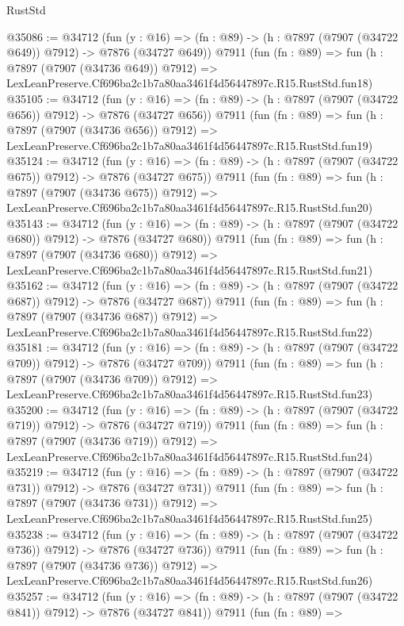 \begin{lexlean}{RustStd}
\begin{coremodule}
@35086 := @34712
    (fun (y : @16) => (fn : @89) -> (h : @7897 (@7907 (@34722 @649)) @7912) -> @7876 (@34727 @649))
    @7911
    (fun (fn : @89) =>
    fun (h : @7897 (@7907 (@34736 @649)) @7912) =>
    LexLeanPreserve.Cf696ba2c1b7a80aa3461f4d56447897c.R15.RustStd.fun18)
@35105 := @34712
    (fun (y : @16) => (fn : @89) -> (h : @7897 (@7907 (@34722 @656)) @7912) -> @7876 (@34727 @656))
    @7911
    (fun (fn : @89) =>
    fun (h : @7897 (@7907 (@34736 @656)) @7912) =>
    LexLeanPreserve.Cf696ba2c1b7a80aa3461f4d56447897c.R15.RustStd.fun19)
@35124 := @34712
    (fun (y : @16) => (fn : @89) -> (h : @7897 (@7907 (@34722 @675)) @7912) -> @7876 (@34727 @675))
    @7911
    (fun (fn : @89) =>
    fun (h : @7897 (@7907 (@34736 @675)) @7912) =>
    LexLeanPreserve.Cf696ba2c1b7a80aa3461f4d56447897c.R15.RustStd.fun20)
@35143 := @34712
    (fun (y : @16) => (fn : @89) -> (h : @7897 (@7907 (@34722 @680)) @7912) -> @7876 (@34727 @680))
    @7911
    (fun (fn : @89) =>
    fun (h : @7897 (@7907 (@34736 @680)) @7912) =>
    LexLeanPreserve.Cf696ba2c1b7a80aa3461f4d56447897c.R15.RustStd.fun21)
@35162 := @34712
    (fun (y : @16) => (fn : @89) -> (h : @7897 (@7907 (@34722 @687)) @7912) -> @7876 (@34727 @687))
    @7911
    (fun (fn : @89) =>
    fun (h : @7897 (@7907 (@34736 @687)) @7912) =>
    LexLeanPreserve.Cf696ba2c1b7a80aa3461f4d56447897c.R15.RustStd.fun22)
@35181 := @34712
    (fun (y : @16) => (fn : @89) -> (h : @7897 (@7907 (@34722 @709)) @7912) -> @7876 (@34727 @709))
    @7911
    (fun (fn : @89) =>
    fun (h : @7897 (@7907 (@34736 @709)) @7912) =>
    LexLeanPreserve.Cf696ba2c1b7a80aa3461f4d56447897c.R15.RustStd.fun23)
@35200 := @34712
    (fun (y : @16) => (fn : @89) -> (h : @7897 (@7907 (@34722 @719)) @7912) -> @7876 (@34727 @719))
    @7911
    (fun (fn : @89) =>
    fun (h : @7897 (@7907 (@34736 @719)) @7912) =>
    LexLeanPreserve.Cf696ba2c1b7a80aa3461f4d56447897c.R15.RustStd.fun24)
@35219 := @34712
    (fun (y : @16) => (fn : @89) -> (h : @7897 (@7907 (@34722 @731)) @7912) -> @7876 (@34727 @731))
    @7911
    (fun (fn : @89) =>
    fun (h : @7897 (@7907 (@34736 @731)) @7912) =>
    LexLeanPreserve.Cf696ba2c1b7a80aa3461f4d56447897c.R15.RustStd.fun25)
@35238 := @34712
    (fun (y : @16) => (fn : @89) -> (h : @7897 (@7907 (@34722 @736)) @7912) -> @7876 (@34727 @736))
    @7911
    (fun (fn : @89) =>
    fun (h : @7897 (@7907 (@34736 @736)) @7912) =>
    LexLeanPreserve.Cf696ba2c1b7a80aa3461f4d56447897c.R15.RustStd.fun26)
@35257 := @34712
    (fun (y : @16) => (fn : @89) -> (h : @7897 (@7907 (@34722 @841)) @7912) -> @7876 (@34727 @841))
    @7911
    (fun (fn : @89) =>

\end{coremodule}
\end{lexlean}
